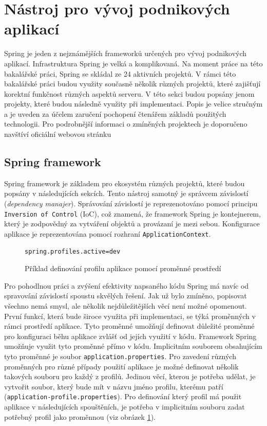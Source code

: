 \section{Nástroj pro vývoj podnikových aplikací}\label{resere:j2ee}
    Spring je jeden z nejznámějších frameworků určených pro vývoj podnikových aplikací. Infrastruktura Spring je velká a komplikovaná. Na moment práce na této bakalářské práci, Spring se skládal ze 24 aktivních projektů\cite{spring-projects}. V rámci této bakalářské práci budou využity současně několik různých projektů, které zajišťují korektní funkčnost různých aspektů serveru. V této sekci budou popsány jenom projekty, které budou následně využity při implementaci. Popis je velice stručným a je uveden za účelem zaručení pochopení čtenářem základů použitých technologii. Pro podrobnější informaci o zmíněných projektech je doporučeno navštíví oficiální webovou stránku\cite{spring-official}
    
    \subsection{Spring framework}
        Spring framework je základem pro ekosystém různých projektů, které budou popsány v následujících sekcích\cite{spring-framework}. Tento nástroj samotný je správcem závislostí (\textit{dependency manajer}). Správování závislostí je reprezenotováno pomocí principu \texttt{Inversion of Control} (IoC), což znamená, že framework Spring je kontejnerem, který je zodpovědný za vytváření objektů a provázaní je mezi sebou. Konfigurace aplikace je reprezentována pomocí rozhraní \texttt{ApplicationContext}.
        
        \begin{figure}
            \begin{verbatim}
spring.profiles.active=dev
            \end{verbatim}
            \caption{Příklad definování profilu aplikace pomocí proměnné prostředí} 
            \label{code:current-spring-profile}
        \end{figure}
        Pro pohodlnou práci a zvýšení efektivity napsaného kódu Spring má navíc od spravování závislostí spoustu skvělých řešení. Jak už bylo zmíněno, popisovat všechno nemá smysl, ale několik nejdůležitějších věcí není možné opomenout. První funkcí, která bude široce využita při implementaci, se týká proměnných v rámci prostředí aplikace. Tyto proměnné umožňují definovat důležité proměnné pro konfiguraci běhu aplikace zvlášť od jejích využití v kódu. Framework Spring umožňuje využit tyto proměnné přímo v kódu. Implicitním souborem obsahujícím tyto proměnné je soubor \texttt{application.properties}. Pro zavedení různých proměnných pro různé případy použití aplikace je možné definovat několik takových souboru pro každý z profilů. Jedinou věcí, kterou je potřeba udělat, je vytvořit soubor, který bude mít v názvu jméno profilu, kterému patří (\texttt{application-{profile}.properties}). Pro definování který profil má použit aplikace v následujících spouštěních, je potřeba v implicitním souboru zadat potřebný profil jako proměnnou (viz obrázek \ref{code:current-spring-profile}). 
        
